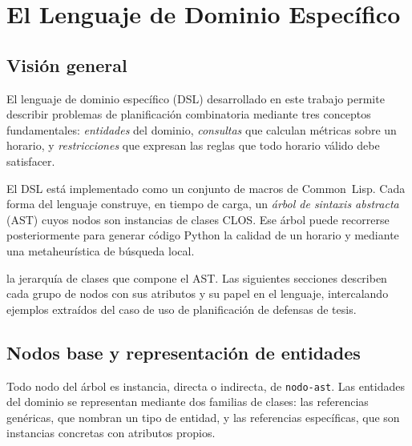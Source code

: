 \documentclass[12pt,a4paper]{report}
\begin{document}
\chapter{El Lenguaje de Dominio Específico}
\label{cap:dsl}

\section{Visión general}

El lenguaje de dominio específico (DSL) desarrollado en este trabajo
permite describir problemas de planificación combinatoria mediante tres
conceptos fundamentales: \emph{entidades} del dominio, \emph{consultas}
que calculan métricas sobre un horario, y \emph{restricciones} que expresan
las reglas que todo horario válido debe satisfacer.

El DSL está implementado como un conjunto de 
macros de Common~Lisp.  Cada forma del lenguaje construye, en tiempo
de carga, un \emph{árbol de sintaxis abstracta} (AST) cuyos nodos son
instancias de clases CLOS.  Ese árbol puede recorrerse posteriormente
para generar código Python   la
calidad de un horario y 
mediante una metaheurística de búsqueda local.

 la jerarquía de clases que compone el AST.
Las siguientes secciones describen cada grupo de nodos con sus atributos
y su papel en el lenguaje, intercalando ejemplos extraídos del caso de
uso de planificación de defensas de tesis.

\section{Nodos base y representación de entidades}
\label{sec:nodos-base}

Todo nodo del árbol es instancia, directa o indirecta, de \texttt{nodo-ast}.
Las entidades del dominio se representan mediante dos familias de clases:
las referencias genéricas, que nombran un tipo de entidad, y las referencias
específicas, que son instancias concretas con atributos propios.
\end{document}
